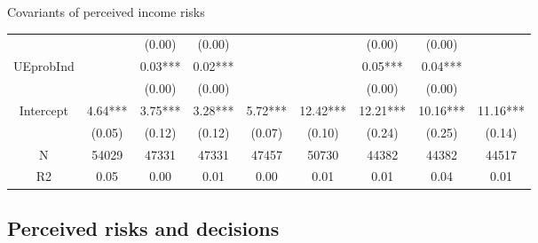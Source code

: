 \documentclass{beamer}
\begin{document}
\begin{frame}{Covariants of perceived income risks}
\begin{table}
{\begin{tabular}{ccccccccc}
	&          &    (0.00) &     (0.00) &             &           &     (0.00) &      (0.00) &              \\
	UEprobInd        &          &   0.03*** &    0.02*** &             &           &    0.05*** &     0.04*** &              \\
	&          &    (0.00) &     (0.00) &             &           &     (0.00) &      (0.00) &              \\
	Intercept        &  4.64*** &   3.75*** &    3.28*** &     5.72*** &  12.42*** &   12.21*** &    10.16*** &     11.16*** \\
	&   (0.05) &    (0.12) &     (0.12) &      (0.07) &    (0.10) &     (0.24) &      (0.25) &       (0.14) \\
	\hline 
	N                &    54029 &     47331 &      47331 &       47457 &     50730 &      44382 &       44382 &        44517 \\
	R2               &     0.05 &      0.00 &       0.01 &        0.00 &      0.01 &       0.01 &        0.04 &         0.01 \\
	\hline 
\end{tabular}
}
	\end{table}
\end{frame}


\subsection{Perceived risks and decisions}
\end{document}
